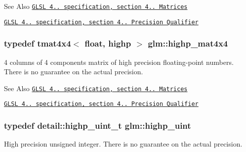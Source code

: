 \begin{DoxySeeAlso}{See Also}
\href{http://www.opengl.org/registry/doc/GLSLangSpec.4.20.8.pdf}{\tt G\-L\-S\-L 4.. specification, section 4.. Matrices} 

\href{http://www.opengl.org/registry/doc/GLSLangSpec.4.20.8.pdf}{\tt G\-L\-S\-L 4.. specification, section 4.. Precision Qualifier} 
\end{DoxySeeAlso}
\hypertarget{group__core__precision_gaccec2a0346f946bcbd656386a9ab87d7}{
\subsubsection[{highp\-\_\-mat4x4}]{\setlength{\rightskip}{0pt plus 5cm}typedef tmat4x4$<$ float, highp $>$ {\bf glm\-::highp\-\_\-mat4x4}}}\label{group__core__precision_gaccec2a0346f946bcbd656386a9ab87d7}
4 columns of 4 components matrix of high precision floating-\/point numbers. There is no guarantee on the actual precision.

\begin{DoxySeeAlso}{See Also}
\href{http://www.opengl.org/registry/doc/GLSLangSpec.4.20.8.pdf}{\tt G\-L\-S\-L 4.. specification, section 4.. Matrices} 

\href{http://www.opengl.org/registry/doc/GLSLangSpec.4.20.8.pdf}{\tt G\-L\-S\-L 4.. specification, section 4.. Precision Qualifier} 
\end{DoxySeeAlso}
\hypertarget{group__core__precision_gabfd1cf11193324a5f77d3831b6ac3205}{
\subsubsection[{highp\-\_\-uint}]{\setlength{\rightskip}{0pt plus 5cm}typedef detail\-::highp\-\_\-uint\-\_\-t {\bf glm\-::highp\-\_\-uint}}}\label{group__core__precision_gabfd1cf11193324a5f77d3831b6ac3205}
High precision unsigned integer. There is no guarantee on the actual precision.

